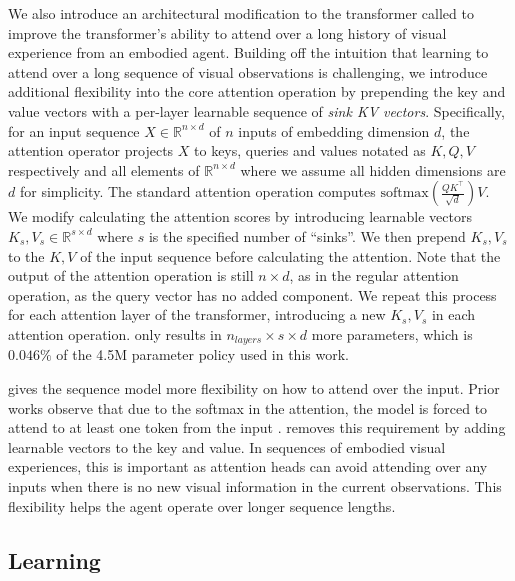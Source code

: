 We also introduce an architectural modification to the transformer called \textbf{\sinkv} to improve the transformer's ability to attend over a long history of visual experience from an embodied agent.
Building off the intuition that learning to attend over a long sequence of visual observations is challenging, we introduce additional flexibility into the core attention operation by prepending the key and value vectors with a per-layer learnable sequence of \emph{sink KV vectors}.
Specifically, for an input sequence $ X \in \mathbb{R}^{n \times d}$ of $ n$ inputs of embedding dimension $ d$, the attention operator projects $ X$ to keys, queries and values notated as $ K, Q, V$ respectively and all elements of $ \mathbb{R}^{n \times d}$ where we assume all hidden dimensions are $d$ for simplicity. 
The standard attention operation computes $ \text{softmax}\left( \frac{Q K^\top}{\sqrt{d}} \right) V $.
We modify calculating the attention scores by introducing learnable vectors $ K_s, V_s \in \mathbb{R}^{s \times d} $ where $ s$ is the specified number of ``sinks''. 
We then prepend $ K_s, V_s$ to the $K, V$ of the input sequence before calculating the attention. 
Note that the output of the attention operation is still $ n \times d$, as in the regular attention operation, as the query vector has no added component.
We repeat this process for each attention layer of the transformer, introducing a new $ K_s, V_s$ in each attention operation.
\sinkv only results in $n_{layers} \times s \times d$ more parameters, which is $0.046\%$ of the 4.5M parameter policy used in this work.

\sinkv gives the sequence model more flexibility on how to attend over the input. 
Prior works observe that due to the softmax in the attention, the model is forced to attend to at least one token from the input \citep{off_by_one_softmax,xiao2023efficient}.
\sinkv removes this requirement by adding learnable vectors to the key and value.
In sequences of embodied visual experiences, this is important as attention heads can avoid attending over any inputs when there is no new visual information in the current observations. 
This flexibility helps the agent operate over longer sequence lengths.

\subsection{\method Learning}
\label{sec:learning} 

